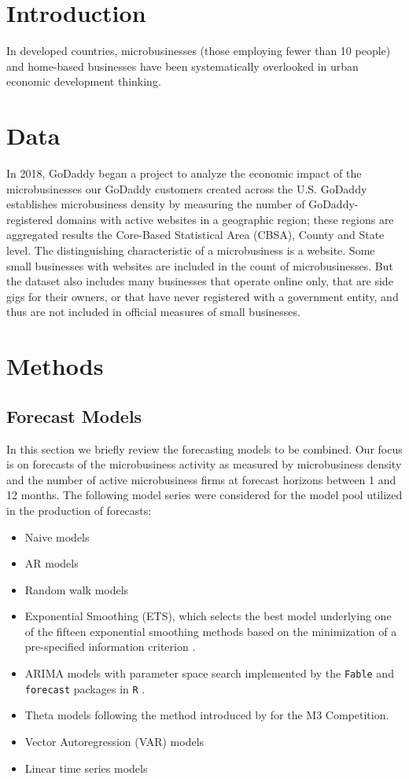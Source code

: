 \documentclass[
a4paper, %
12pt, %
]{CascadeAnalyticsWPS}
\begin{document}
	\newpage

\section{Introduction}
	
In developed countries, microbusinesses (those employing fewer than 10 people) and home-based businesses have been systematically overlooked in urban economic development thinking.
\section{Data}
In 2018, GoDaddy began a project to analyze the economic impact of the microbusinesses our GoDaddy customers created across the U.S. GoDaddy establishes microbusiness density by measuring the number of GoDaddy-registered domains with active websites in a geographic region; these regions are aggregated results the Core-Based Statistical Area (CBSA), County and State level. The distinguishing characteristic of a microbusiness is a website. Some small businesses with websites are included in the count of microbusinesses. But the dataset also includes many businesses that operate online only, that are side gigs for their owners, or that have never registered with a government entity, and thus are not included in official measures of small businesses.

\section{Methods}
\label{sec:sec3}
\subsection{Forecast Models}
\label{sec:sec3.1}
In this section we briefly review the forecasting models to be combined. Our focus is on forecasts of the microbusiness activity as measured by microbusiness density and the number of active microbusiness firms at forecast horizons between 1 and 12 months. The following model series were considered for the model pool utilized in the production of forecasts:
\begin{itemize}
\item Naive models 
\item AR models
\item Random walk models
\item Exponential Smoothing (ETS), which selects the best model
underlying one of the fifteen exponential smoothing
methods based on the minimization of a pre-specified
information criterion \citep{hyndman2002}.
\item ARIMA models with parameter space search implemented by the \texttt{\footnotesize{Fable}} and \texttt{\footnotesize{forecast}} packages in \texttt{\footnotesize{R}} \citep{hyndman2008}.
\item Theta models following the method introduced by \cite{assimakopoulos_2000} for the M3 Competition.
\item Vector Autoregression (VAR) models
\item Linear time series models
\end{itemize}
\end{document}
